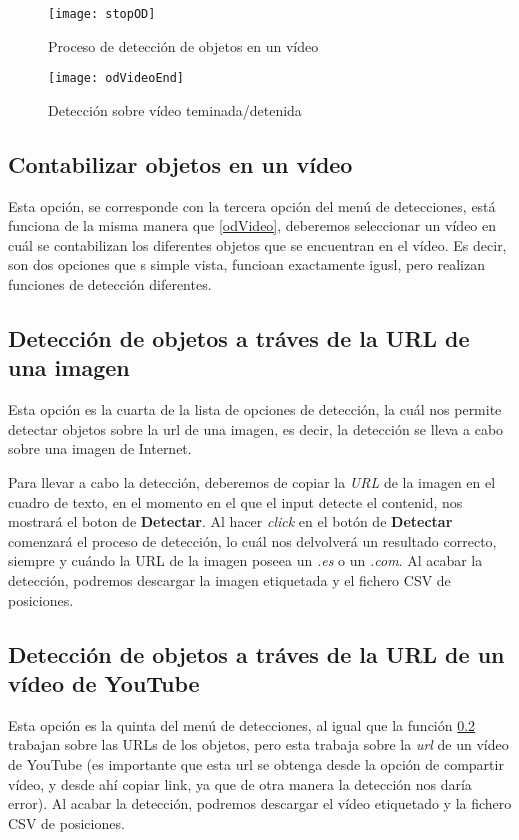 \begin{figure}[!h]
    \centering
    \texttt{[image: stopOD]}
    \caption{Proceso de detección de objetos en un vídeo}\label{fig:stopOD}
\end{figure}

\begin{figure}[!h]
    \centering
    \texttt{[image: odVideoEnd]}
    \caption{Detección sobre vídeo teminada/detenida}\label{fig:odVideoEnd}
\end{figure}

\subsection{Contabilizar objetos en un vídeo} \label{odTrack}
Esta opción, se corresponde con la tercera opción del menú de detecciones, está funciona de la misma manera que \ref{odVideo}, deberemos seleccionar un vídeo en cuál se contabilizan los diferentes objetos que se encuentran en el vídeo.
Es decir, son dos opciones que s simple vista, funcioan exactamente igusl, pero realizan funciones de detección diferentes.

\subsection{Detección de objetos a tráves de la URL de una imagen} \label{odURl}
Esta opción es la cuarta de la lista de opciones de detección, la cuál nos permite detectar objetos sobre la url de una imagen, es decir, la detección se lleva a cabo sobre una imagen de Internet.


Para llevar a cabo la detección, deberemos de copiar la \textit{URL} de la imagen en el cuadro de texto, en el momento en el que el input detecte el contenid, nos mostrará el boton de \textbf{Detectar}.
Al hacer \textit{click} en el botón de \textbf{Detectar} comenzará el proceso de detección, lo cuál nos delvolverá un resultado correcto, siempre y cuándo la URL de la imagen poseea un \textit{.es} o un \textit{.com}.
Al acabar la detección, podremos descargar la imagen etiquetada y el fichero CSV de posiciones.


\subsection{Detección de objetos a tráves de la URL de un vídeo de YouTube}
Esta opción es la quinta del menú de detecciones, al igual que la función \ref{odURl} trabajan sobre las URLs de los objetos, pero esta trabaja sobre la \textit{url} de un vídeo de YouTube (es importante que esta url se obtenga desde la opción de compartir vídeo, y desde ahí copiar link, ya que de otra manera la detección nos daría error).
Al acabar la detección, podremos descargar el vídeo etiquetado y la fichero CSV de posiciones.

